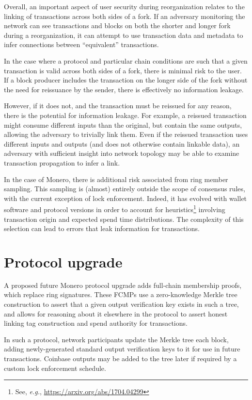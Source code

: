 \documentclass{article}
\theoremstyle{definition}
\begin{document}
Overall, an important aspect of user security during reorganization relates to the linking of transactions across both sides of a fork.
If an adversary monitoring the network can see transactions and blocks on both the shorter and longer fork during a reorganization, it can attempt to use transaction data and metadata to infer connections between ``equivalent'' transactions.

In the case where a protocol and particular chain conditions are such that a given transaction is valid across both sides of a fork, there is minimal risk to the user.
If a block producer includes the transaction on the longer side of the fork without the need for reissuance by the sender, there is effectively no information leakage.

However, if it does not, and the transaction must be reissued for any reason, there is the potential for information leakage.
For example, a reissued transaction might consume different inputs than the original, but contain the same outputs, allowing the adversary to trivially link them.
Even if the reissued transaction uses different inputs and outputs (and does not otherwise contain linkable data), an adversary with sufficient insight into network topology may be able to examine transaction propagation to infer a link.

In the case of Monero, there is additional risk associated from ring member sampling.
This sampling is (almost) entirely outside the scope of consensus rules, with the current exception of lock enforcement.
Indeed, it has evolved with wallet software and protocol versions in order to account for heuristics\footnote{See, \textit{e.g.}, \url{https://arxiv.org/abs/1704.04299}} involving transaction origin and expected spend time distributions.
The complexity of this selection can lead to errors that leak information for transactions.


\section{Protocol upgrade}

A proposed future Monero protocol upgrade adds full-chain membership proofs, which replace ring signatures.
These FCMPs use a zero-knowledge Merkle tree construction to assert that a given output verification key exists in such a tree, and allows for reasoning about it elsewhere in the protocol to assert honest linking tag construction and spend authority for transactions.

In such a protocol, network participants update the Merkle tree each block, adding newly-generated standard output verification keys to it for use in future transactions.
Coinbase outputs may be added to the tree later if required by a custom lock enforcement schedule.
\end{document}
